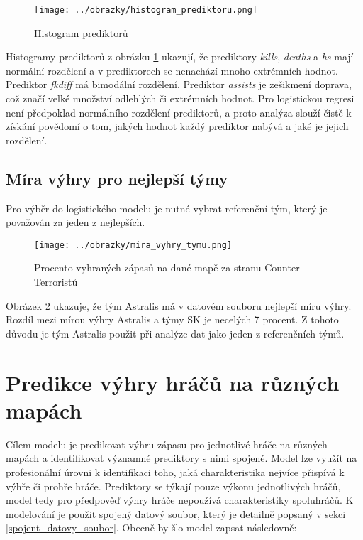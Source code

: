 \begin{figure}[H]
    \centering
    \texttt{[image: ../obrazky/histogram\_prediktoru.png]}
    \caption{Histogram prediktorů} 
    \label{fig:histogram_prediktoru}
\end{figure}

Histogramy prediktorů z obrázku \ref{fig:histogram_prediktoru} ukazují, že prediktory \textit{kills}, \textit{deaths} a \textit{hs} mají normální rozdělení
a v prediktorech se nenachází mnoho extrémních hodnot. Prediktor \textit{fkdiff} má bimodální rozdělení. Prediktor \textit{assists} je 
zešikmení doprava, což značí velké množství odlehlých či extrémních hodnot. Pro logistickou regresi není předpoklad normálního rozdělení prediktorů, a proto analýza
slouží čistě k získání povědomí o tom, jakých hodnot každý prediktor nabývá a jaké je jejich rozdělení.

\subsection{Míra výhry pro nejlepší týmy}
Pro výběr do logistického modelu je nutné vybrat referenční tým, který je považován za jeden z nejlepších. 

\begin{figure}[H]
    \centering
    \texttt{[image: ../obrazky/mira\_vyhry\_tymu.png]}
    \caption{Procento vyhraných zápasů na dané mapě za stranu Counter-Terroristů} 
    \label{fig:mira_vyhry_tymu}
\end{figure}

Obrázek \ref{fig:mira_vyhry_tymu} ukazuje, že tým Astralis má v datovém souboru nejlepší míru výhry. Rozdíl mezi mírou výhry Astralis a týmy SK je necelých 7 procent.
Z tohoto důvodu je tým Astralis použit při analýze dat jako jeden z referenčních týmů.

\newpage
\section{Predikce výhry hráčů na různých mapách}
Cílem modelu je predikovat výhru zápasu pro jednotlivé hráče na různých mapách a identifikovat významné prediktory s nimi spojené. Model lze využít na profesionální
úrovni k identifikaci toho, jaká charakteristika nejvíce přispívá k výhře či prohře hráče. Prediktory se týkají pouze výkonu jednotlivých
hráčů, model tedy pro předpověď výhry hráče nepoužívá charakteristiky spoluhráčů. K modelování je použit spojený datový soubor, který je detailně popsaný v
sekci \ref{spojent_datovy_soubor}. Obecně by šlo model zapsat následovně:

